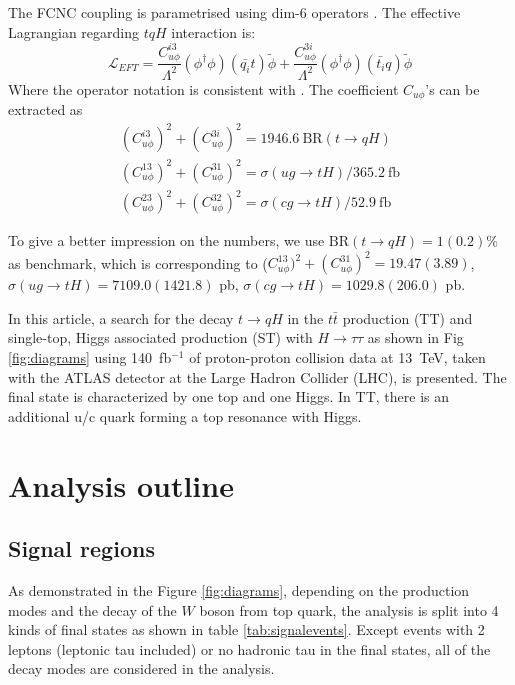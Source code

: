 The FCNC coupling is parametrised using dim-6 operators \cite{fcnc_production_theory}. The effective Lagrangian regarding $tqH$ interaction is:
%
\begin{equation}
\mathcal{L}_{EFT} = \frac{C^{i3}_{u\phi}}{\Lambda^{2}}(\phi^{\dagger}\phi)(\bar{q_{i}}t)\tilde{\phi} + \frac{C^{3i}_{u\phi}}{\Lambda^{2}}(\phi^{\dagger}\phi)(\bar{t_{i}}q)\tilde{\phi}
\label{eq:eq01}
\end{equation}
%
Where the operator notation is consistent with \cite{fcnc_production_theory}. The coefficient $C_{u\phi}$'s can be extracted as
\begin{equation}
\begin{array}{l}
(C^{i3}_{u\phi})^2 + (C^{3i}_{u\phi})^2 = 1946.6~\text{BR}(t\to qH)\\
(C^{13}_{u\phi})^2 + (C^{31}_{u\phi})^2 = \sigma(ug\to tH)/365.2~\text{fb}\\
(C^{23}_{u\phi})^2 + (C^{32}_{u\phi})^2 = \sigma(cg\to tH)/52.9~\text{fb}
\end{array}
\label{eq:eq02}
\end{equation}

To give a better impression on the numbers, we use $\text{BR}(t\to qH)=1(0.2)\%$ as benchmark, which is corresponding to ($C^{13}_{u\phi})^2 + (C^{31}_{u\phi})^2=19.47(3.89)$, $\sigma(ug\to tH)=7109.0(1421.8)$ pb, $\sigma(cg\to tH)=1029.8(206.0)$ pb.

In this article, a search for the decay $t\to qH$ in the $t\bar{t}$ production (TT) and single-top, Higgs associated production (ST) with $H\to\tau\tau$  as shown in Fig \ref{fig:diagrams} using 140~fb$^{-1}$ of proton-proton collision data at 13~TeV, taken with the ATLAS detector at the Large Hadron Collider (LHC), is presented. The final state is characterized by one top and one Higgs. In TT, there is an additional u/c quark forming a top resonance with Higgs.



\section{Analysis outline}

\subsection{Signal regions}
\label{sec:SRs}
As demonstrated in the Figure \ref{fig:diagrams}, depending on the production modes and the decay of the $W$ boson from top quark, the analysis is split into 4 kinds of final states as shown in table \ref{tab:signalevents}. Except events with 2 leptons (leptonic tau included) or no hadronic tau in the final states, all of the decay modes are considered in the analysis.

